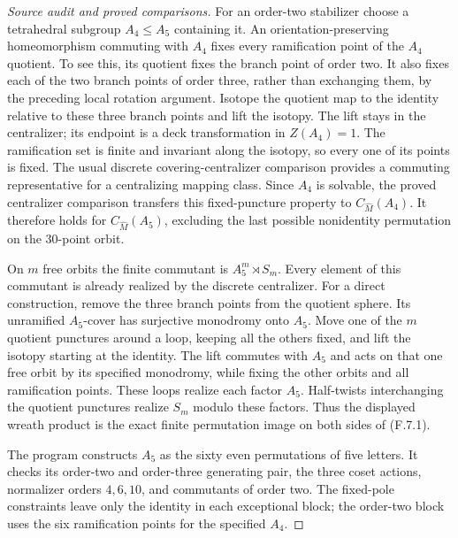 \begin{proof}[Source audit and proved comparisons]
For an order-two stabilizer choose a tetrahedral
subgroup $A_4\le A_5$ containing it. An
orientation-preserving homeomorphism commuting
with $A_4$ fixes every ramification point of the
$A_4$ quotient. To see this, its quotient fixes the
branch point of order two. It also fixes each of the
two branch points of order three, rather than
exchanging them, by the preceding local rotation
argument. Isotope the quotient map to the identity
relative to these three branch points and lift the
isotopy. The lift stays in the centralizer; its
endpoint is a deck transformation in $Z(A_4)=1$.
The ramification set is finite and invariant along
the isotopy, so every one of its points is fixed.
The usual discrete covering-centralizer comparison
provides a commuting representative for a centralizing
mapping class. Since $A_4$ is solvable, the proved
centralizer comparison transfers this fixed-puncture
property to $C_{\widehat M}(A_4)$. It therefore holds
for $C_{\widehat M}(A_5)$, excluding the last possible
nonidentity permutation on the $30$-point orbit.

On $m$ free orbits the finite commutant is
$A_5^m\rtimes S_m$. Every element of this commutant
is already realized by the discrete centralizer.
For a direct construction, remove the three branch
points from the quotient sphere. Its unramified
$A_5$-cover has surjective monodromy onto $A_5$.
Move one of the $m$ quotient punctures around a
loop, keeping all the others fixed, and lift the
isotopy starting at the identity. The lift commutes
with $A_5$ and acts on that one free orbit by its
specified monodromy, while fixing the other orbits
and all ramification points. These loops realize
each factor $A_5$. Half-twists interchanging the
quotient punctures realize $S_m$ modulo these factors.
Thus the displayed wreath product is the exact
finite permutation image on both sides of (F.7.1).

The program
constructs $A_5$ as the sixty even permutations of
five letters. It checks its order-two and order-three
generating pair, the three coset actions, normalizer
orders $4,6,10$, and commutants of order two. The
fixed-pole constraints leave only the identity in
each exceptional block; the order-two block uses
the six ramification points for the specified $A_4$.


\end{proof}
